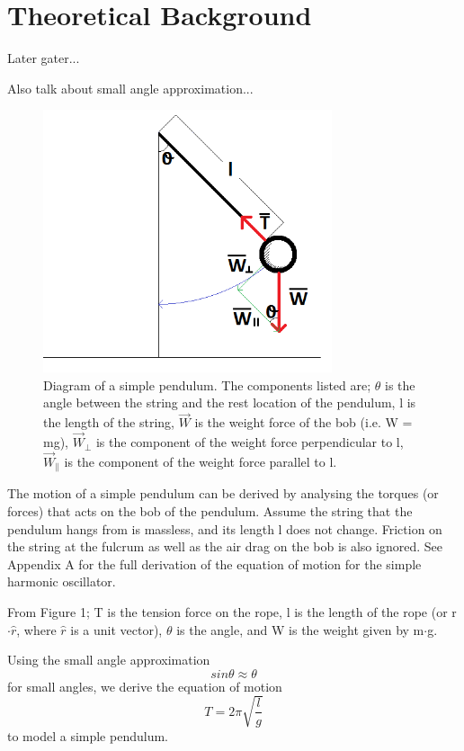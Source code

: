\documentclass[iop]{emulateapj}
\begin{document}
\section{Theoretical Background}
\label{sec:theory}




Later gater...


Also talk about small angle approximation...




\begin{figure}[H]
\centering
\includegraphics[width=85mm]{../../Images/FreebodyDiagram.png}
\caption{Diagram of a simple pendulum. The components listed are;
$\theta$ is the angle between the string
and the rest location of the pendulum, l is the length of the string,
$\vec{W}$ is the weight force of the bob (i.e. W = mg), $\vec{W}_\perp$ is the 
component of the weight force perpendicular to l, $\vec{W}_\parallel$ 
is the component of the weight force parallel to l.}
\label{Pendulum}
\end{figure}


The motion of a simple pendulum can be derived by analysing the torques (or forces) that acts 
on the bob of the pendulum. Assume the string that the pendulum hangs from is massless, and
its length l does not change. Friction on the string at the fulcrum as well as the
air drag on the bob is also ignored. See Appendix A for the full derivation
of the equation of motion for the simple harmonic oscillator.


From Figure 1; T is the tension force on the rope, l is the length of the
rope (or r$\cdot\hat{r}$, where $\hat{r}$ is a unit vector), $\theta$ is the angle, and W is the weight given by m$\cdot$g.


Using the small angle approximation
\begin{equation}
\boxed{sin\theta \approx \theta}
\end{equation}
for small angles, we derive the equation of motion
\begin{equation}
\boxed{T = 2\pi\sqrt{\frac{l}{g}}}
\end{equation}
to model a simple pendulum.
\end{document}
